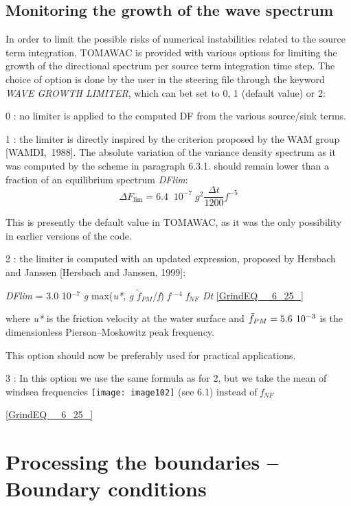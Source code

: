\subsection{ Monitoring the growth of the wave spectrum }

 In order to limit the possible risks of numerical instabilities related to the source term integration, TOMAWAC is provided with various options for limiting the growth of the directional spectrum per source term integration time step. The choice of option is done by the user in the steering file through the keyword\textit{ WAVE GROWTH LIMITER}, which can bet set to 0, 1 (default value) or 2:

 0 : no limiter is applied to the computed DF from the various source/sink terms.

 1 : the limiter is directly inspired by the criterion proposed by the WAM group [WAMDI,~1988]. The absolute variation of the variance density spectrum as it was computed by the scheme in paragraph 6.3.1. should remain lower than a fraction of an equilibrium spectrum \textit{DFlim}:
\begin{equation} \label{GrindEQ__6_24_}
\Delta F_{\lim } =6.4\; \; 10^{-7} \; g^{2} \frac{\Delta t}{1200} f^{-5}
\end{equation}

 This is presently the default value in TOMAWAC, as it was the only possibility in earlier versions of the code.

 2 : the limiter is computed with an updated expression, proposed by Hersbach and Janssen [Hersbach and Janssen, 1999]:

          \textit{DFlim} = 3.0 10${}^{-7}$ \textit{g} max(\textit{u*}, \textit{g} $\tilde{f}_{PM} $/\textit{f}) \textit{f} ${}^{-4}$ \textit{f${}_{NF}$ Dt} \eqref{GrindEQ__6_25_}

 where \textit{u*} is the friction velocity at the water surface and $\tilde{f}_{PM} =5.6{\kern 1pt} \; 10^{-3} $ is the dimensionless Pierson--Moskowitz peak frequency.

 This option should now be preferably used for practical applications.

 3 : In this option we use the same formula as for 2, but we take the mean of windsea frequencies  \texttt{[image: image102]} (see 6.1) instead of \textit{f${}_{NF}$}

 \eqref{GrindEQ__6_25_}




\section{ Processing the boundaries -- Boundary conditions}


